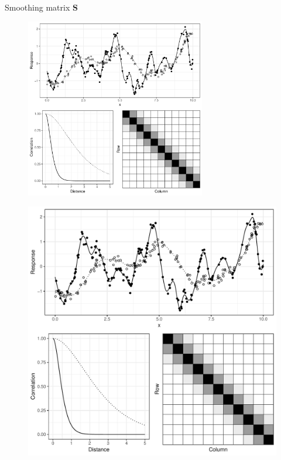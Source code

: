 \documentclass{beamer}
\begin{document}
\begin{frame}{Smoothing matrix $\bm{S}$}
  \begin{figure}[h]
    \begin{center}
      \includegraphics[width=0.7\textwidth, trim={0 9cm 0 0}, clip]{figures/smooth_corr.pdf}
    \end{center}
  \end{figure}
    \begin{figure}[h]
    \begin{center}
      \includegraphics[height=0.4\textheight, trim={9cm 0 0 9cm}, clip]{figures/smooth_corr.pdf}
    \end{center}
  \end{figure}
\end{frame}
\end{document}
